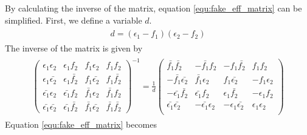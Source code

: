 By calculating the inverse of the matrix, equation \ref{equ:fake_eff_matrix} can be simplified.
First, we define a variable $d$.
\begin{align}
\begin{split}
d = (\epsilon_1 - f_1) (\epsilon_2 - f_2)
\end{split}
\end{align}
The inverse of the matrix is given by
\begin{align}
\begin{split}
\left( \begin{array}{cccc}
\epsilon_1 \epsilon_2 & \epsilon_1 f_2 & f_1 \epsilon_2 & f_1 f_2 \\
\epsilon_1 \bar{\epsilon_2} & \epsilon_1 \bar{f_2} & f_1 \bar{\epsilon_2} & f_1 \bar{f_2} \\
\bar{\epsilon_1} \epsilon_2 & \bar{\epsilon_1} f_2 & \bar{f_1} \epsilon_2 & \bar{f_1} f_2 \\
\bar{\epsilon_1} \bar{\epsilon_2} & \bar{\epsilon_1} \bar{f_2} & \bar{f_1} \bar{\epsilon_2} & \bar{f_1} \bar{f_2}
\end{array} \right)^{-1}
= \frac{1}{d}
\left( \begin{array}{cccc}
  \bar{f_1}        \bar{f_2}        & - \bar{f_1}        f_2        & - f_1        \bar{f_2}        &   f_1        f_2        \\
- \bar{f_1}        \bar{\epsilon_2} &   \bar{f_1}        \epsilon_2 &   f_1        \bar{\epsilon_2} & - f_1        \epsilon_2 \\
- \bar{\epsilon_1} \bar{f_2}        &   \bar{\epsilon_1} f_2        &   \epsilon_1 \bar{f_2}        & - \epsilon_1 f_2        \\
  \bar{\epsilon_1} \bar{\epsilon_2} & - \bar{\epsilon_1} \epsilon_2 & - \epsilon_1 \bar{\epsilon_2} &   \epsilon_1 \epsilon_2 \\
\end{array} \right)
\end{split}
\end{align}
Equation \ref{equ:fake_eff_matrix} becomes
